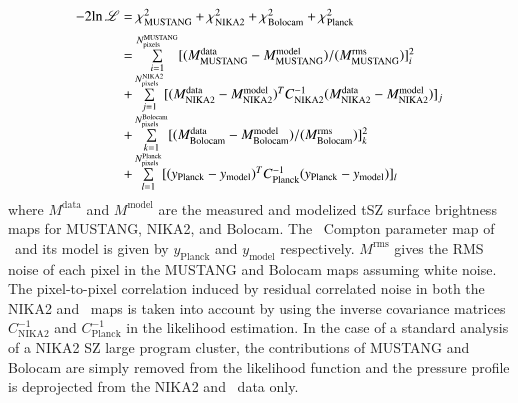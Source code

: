 \documentclass[traditabstract]{aa}
\begin{document}
\begin{equation}
\begin{tabular}{r@{\hskip 1mm}l}
       $-2 \mathrm{ln} \, \mathscr{L}$  & $ =\chi^2_{\mathrm{MUSTANG}} + \chi^2_{\mathrm{NIKA2}} + \chi^2_{\mathrm{Bolocam}} + \chi^2_{\mathrm{Planck}}$\\[0.2cm]
       & $=\sum\limits_{\substack{i=1}}^{N_{\mathrm{pixels}}^{\mathrm{MUSTANG}}} [(M_{\mathrm{MUSTANG}}^{\mathrm{data}} - M_{\mathrm{MUSTANG}}^{\mathrm{model}})/(M_{\mathrm{MUSTANG}}^{\mathrm{rms}})]_i^2$ \\[0.2cm]
       & $+\sum\limits_{\substack{j=1}}^{N_{\mathrm{pixels}}^{\mathrm{NIKA2}}} [(M_{\mathrm{NIKA2}}^{\mathrm{data}} - M_{\mathrm{NIKA2}}^{\mathrm{model}})^T C_{\mathrm{NIKA2}}^{-1} (M_{\mathrm{NIKA2}}^{\mathrm{data}} - M_{\mathrm{NIKA2}}^{\mathrm{model}})]_j $ \\[0.2cm]
       & $+\sum\limits_{\substack{k=1}}^{N_{\mathrm{pixels}}^{\mathrm{Bolocam}}} [(M_{\mathrm{Bolocam}}^{\mathrm{data}} - M_{\mathrm{Bolocam}}^{\mathrm{model}})/(M_{\mathrm{Bolocam}}^{\mathrm{rms}})]_k^2$ \\[0.2cm]
       & $+ \sum\limits_{\substack{l=1}}^{N_{\mathrm{pixels}}^{\mathrm{Planck}}} [(y_{\mathrm{Planck}} - y_{\mathrm{model}})^T C_{\mathrm{Planck}}^{-1} (y_{\mathrm{Planck}} - y_{\mathrm{model}})]_l$
\label{eq:chi2_SZ_combined}
\end{tabular}
\end{equation}
where $M^{\mathrm{data}}$ and $M^{\mathrm{model}}$ are the measured and modelized tSZ surface brightness maps for MUSTANG, NIKA2, and Bolocam. The \planck\ Compton parameter map of \psz\ and its model is given by $y_{\mathrm{Planck}}$ and $y_{\mathrm{model}}$ respectively. $M^{\mathrm{rms}}$ gives the RMS noise of each pixel in the MUSTANG and Bolocam maps assuming white noise. The pixel-to-pixel correlation induced by residual correlated noise in both the NIKA2 and \planck\ maps is taken into account by using the inverse covariance matrices $C_{\mathrm{NIKA2}}^{-1}$ and $C_{\mathrm{Planck}}^{-1}$ in the likelihood estimation. In the case of a standard analysis of a NIKA2 SZ large program cluster, the contributions of MUSTANG and Bolocam are simply removed from the likelihood function and the pressure profile is deprojected from the NIKA2 and \planck\ data only.\\
\end{document}

